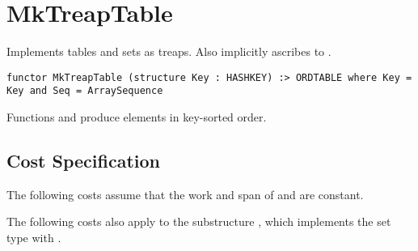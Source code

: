 \chapter{MkTreapTable}
\label{ch:treap-table}

\begin{cluster}
\label{grp:grm:treap-table::implements}

\begin{gram}
\label{grm:treap-table::implements}
\label{ch:treap-table}
\begin{preamble}
Implements tables and sets as treaps. Also implicitly ascribes to .
\begin{verbatim}
functor MkTreapTable (structure Key : HASHKEY) :> ORDTABLE where Key = Key and Seq = ArraySequence
\end{verbatim}
\end{preamble}

\end{gram}
\end{cluster}

\begin{cluster}
\label{grp:grm:treap-table::implementation-defined-behavior}

\begin{gram}
\label{grm:treap-table::implementation-defined-behavior}
Functions  and  produce elements in key-sorted order.

\end{gram}
\end{cluster}


\section{Cost Specification}
\label{sec:treap-table::cost-specification}

\begin{cluster}
\label{grp:grm:treap-table::costs}

\begin{gram}
\label{grm:treap-table::costs}
The following costs assume that the work and span of 
and  are constant.

\end{gram}
\end{cluster}

\begin{cluster}
\label{grp:grm:treap-table::apply}

\begin{gram}
\label{grm:treap-table::apply}
The following costs also apply to the substructure , which implements
the set type with .

\end{gram}
\end{cluster}

